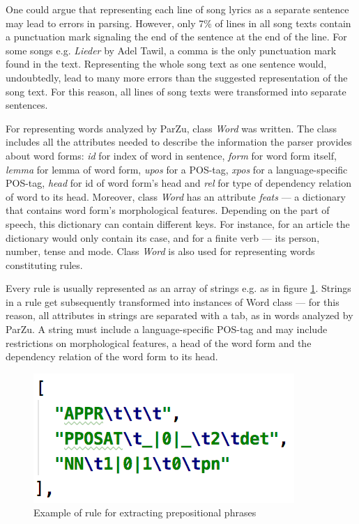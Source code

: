 One could argue that representing each line of song lyrics as a separate sentence may lead to errors in parsing. However, only 7\% of lines in all song texts contain a punctuation mark signaling the end of the sentence at the end of the line. For some songs e.g. \textit{Lieder} by Adel Tawil, a comma is the only punctuation mark found in the text. Representing the whole song text as one sentence would, undoubtedly, lead to many more errors than the suggested representation of the song text. For this reason, all lines of song texts were transformed into separate sentences. 

For representing words analyzed by ParZu, class \textit{Word} was written. The class includes all the attributes needed to describe the information the parser provides about word forms: \textit{id} for index of word in sentence, \textit{form} for word form itself, \textit{lemma} for lemma of word form, \textit{upos} for a POS-tag, \textit{xpos} for a language-specific POS-tag, \textit{head} for id of word form's head and \textit{rel} for type of dependency relation of word to its head. Moreover, class \textit{Word} has an attribute \textit{feats} --- a dictionary that contains word form's morphological features. Depending on the part of speech, this dictionary can contain different keys. For instance, for an article the dictionary would only contain its case, and for a finite verb --- its person, number, tense and mode. Class \textit{Word} is also used for representing words constituting rules.

Every rule is usually represented as an array of strings e.g. as in figure \ref{fig:pp-rule}. Strings in a rule get subsequently transformed into instances of Word class --- for this reason, all attributes in strings are separated with a tab, as in words analyzed by ParZu. A string must include a language-specific POS-tag and may include restrictions on morphological features, a head of the word form and the dependency relation of the word form to its head.

\begin{figure}[H]
    \centering
    \includegraphics[scale = 1]{images/pp-rule.png}
    \caption{Example of rule for extracting prepositional phrases}
    \label{fig:pp-rule}
\end{figure}

